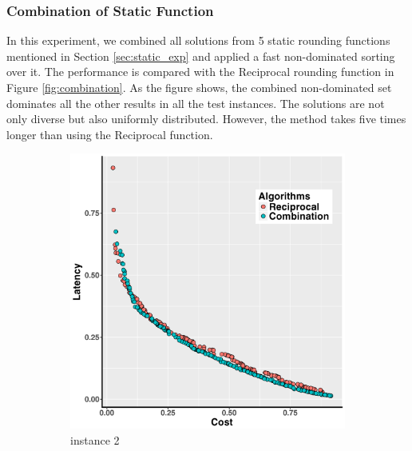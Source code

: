 \documentclass[10pt,journal,compsoc]{IEEEtran}
\begin{document}
\vspace{-3 mm}
\subsubsection{Combination of Static Function}
In this experiment, we combined all solutions from 5 static rounding functions mentioned in Section \ref{sec:static_exp} and applied
a fast non-dominated sorting over it. The performance is compared with the Reciprocal rounding function in Figure \ref{fig:combination}.
As the figure shows, the combined non-dominated set dominates all the other results in all the test instances. The solutions are not only diverse but also uniformly distributed.
However, the method takes five times longer than using the Reciprocal function.

\begin{figure}[h!]
   \centering
   \begin{subfigure}{0.49\linewidth}
       \includegraphics[width=\textwidth]{pics/combination_problem2.png}
    \caption{instance 2}
   \end{subfigure}
   \begin{subfigure}{0.49\linewidth}

\end{subfigure}
\end{figure}
\end{document}

